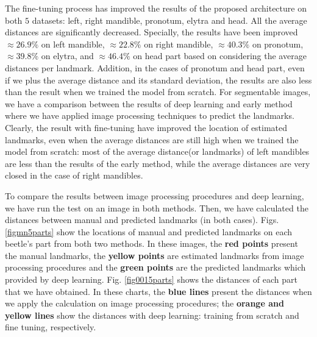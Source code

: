 \documentclass[review]{elsarticle}
\begin{document}
The fine-tuning process has improved the results of the proposed architecture on both $5$ datasets: left, right mandible, pronotum, elytra and head. All the average distances are significantly decreased. Specially, the results have been improved $\approx 26.9\%$ on left mandible, $\approx 22.8\%$ on right mandible, $\approx 40.3\%$ on pronotum, $\approx 39.8\%$ on elytra, and $\approx 46.4\%$  on head part based on considering the average distances per landmark. Addition, in the cases of pronotum and head part, even if we plus the average distance and its standard deviation, the results are also less than the result when we trained the model from scratch. For segmentable images, we have a comparison between the results of deep learning and early method where we have applied image processing techniques to predict the landmarks. Clearly, the result with fine-tuning have improved the location of estimated landmarks, even when the average distances are still high when we trained the model from scratch: most of the average distance(or landmarks) of left mandibles are less than the results of the early method, while the average distances are very closed in the case of right mandibles.

To compare the results between image processing procedures and deep learning, we have run the test on an image in both methods. Then, we have calculated the distances between manual and predicted landmarks (in both cases). Figs. \ref{figmn5parts} show the locations of manual and predicted landmarks on each beetle's part from both two methods. In these images, the \textbf{red points} present the manual landmarks, the \textbf{yellow points} are estimated landmarks from image processing procedures and the \textbf{green points} are the predicted landmarks which provided by deep learning. Fig. \ref{fig0015parts} shows the distances of each part that we have obtained. In these charts, the \textbf{blue lines} present the distances when we apply the calculation on image processing procedures; the \textbf{orange and yellow lines} show the distances with deep learning: training from scratch and fine tuning, respectively.
\end{document}
